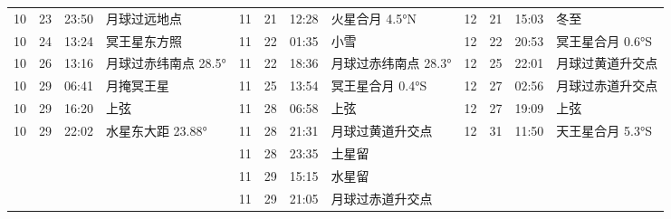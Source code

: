 \begin{tabular}{llll|llll|llll}
10 & 23 & 23:50 & 月球过远地点 & 11 & 21 & 12:28 & 火星合月 4.5°N & 12 & 21 & 15:03 & 冬至 \tabularnewline
10 & 24 & 13:24 & 冥王星东方照 & 11 & 22 & 01:35 & 小雪 & 12 & 22 & 20:53 & 冥王星合月 0.6°S \tabularnewline
10 & 26 & 13:16 & 月球过赤纬南点 28.5° & 11 & 22 & 18:36 & 月球过赤纬南点 28.3° & 12 & 25 & 22:01 & 月球过黄道升交点 \tabularnewline
10 & 29 & 06:41 & 月掩冥王星 & 11 & 25 & 13:54 & 冥王星合月 0.4°S & 12 & 27 & 02:56 & 月球过赤道升交点 \tabularnewline
10 & 29 & 16:20 & 上弦 & 11 & 28 & 06:58 & 上弦 & 12 & 27 & 19:09 & 上弦 \tabularnewline
10 & 29 & 22:02 & 水星东大距 23.88° & 11 & 28 & 21:31 & 月球过黄道升交点 & 12 & 31 & 11:50 & 天王星合月 5.3°S \tabularnewline
 &  &  &  & 11 & 28 & 23:35 & 土星留 &  &  &  &  \tabularnewline
 &  &  &  & 11 & 29 & 15:15 & 水星留 &  &  &  &  \tabularnewline
 &  &  &  & 11 & 29 & 21:05 & 月球过赤道升交点 &  &  &  &  \tabularnewline
\hline \end{tabular}
